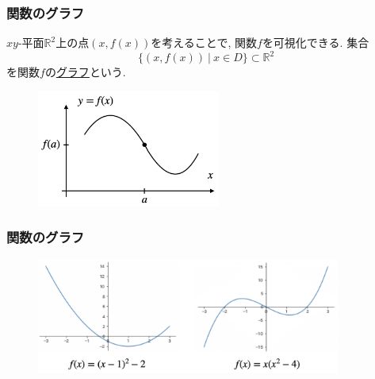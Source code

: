 \documentclass[dvipdfmx,cjk,10.2pt]{beamer}
\newcommand{\R}{\mathbb{R}}
\theoremstyle{definition}
\begin{document}


\begin{frame}
\frametitle{関数のグラフ}   

$xy$-平面$\R^2$上の点$(x,f(x))$を考えることで, 関数$f$を可視化できる. 
集合
$$
\{(x,f(x)) \ | \ x \in D\} \subset \R^2
$$
を関数$f$の\underline{グラフ}という. 

\begin{figure}[htbp]
 \begin{center} 
  \includegraphics[width=60mm]{graph.png}
 \end{center}
\end{figure}


\end{frame}



\begin{frame}
\frametitle{関数のグラフ}   


\begin{figure}[htbp]
 \begin{center} 
  \includegraphics[width=100mm]{graph2.png}
 \end{center}
\end{figure}


\end{frame}


\end{document}
